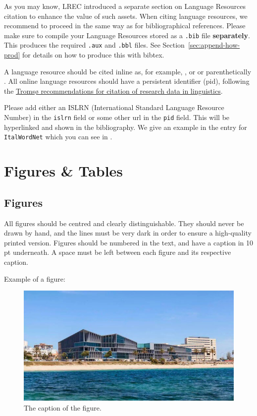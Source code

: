 \documentclass[10pt, a4paper]{article}
\begin{document}
As you may know, LREC introduced a separate section on Language
Resources citation to enhance the value of such assets. When citing
language resources, we recommend to proceed in the same way as for
bibliographical references. Please make sure to compile your Language
Resources stored as a \texttt{.bib} file \textbf{separately}. This
produces the required \texttt{.aux} and \texttt{.bbl} files.  See
Section~\ref{sec:append-how-prod} for details on how to produce this
with bibtex.

A language resource should be cited inline as, for example,
, or  or
parenthetically .  All online
language resources should have a persistent identifier (pid), following the \href{https://doi.org/10.15497/RDA00040}{Tromsø recommendations for citation of research data in linguistics}.

Please add either an ISLRN (International Standard Language Resource
Number) in the \texttt{islrn} field or some other url in the
\texttt{pid} field.  This will be hyperlinked and shown in the
bibliography.  We give an example in the entry for \texttt{ItalWordNet} which you can see in .
  



  
\section{Figures \& Tables}

\subsection{Figures}

All figures should be centred and clearly distinguishable. They should never be drawn by hand, and the lines must be very dark in order to ensure a high-quality printed version. Figures should be numbered in the text, and have a caption in 10 pt underneath. A space must be left between each figure and its respective caption. 

Example of a figure:

\begin{figure}[!ht]
\begin{center}
\includegraphics[width=\columnwidth]{home-palacio.jpg}
\caption{The caption of the figure.}
\label{fig.1}
\end{center}
\end{figure}
\end{document}
